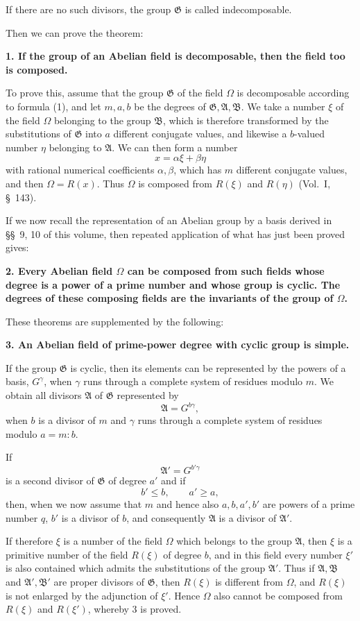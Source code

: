 \documentclass[11pt]{article}
\newcommand{\Om}{\Omega}
\newcommand{\Gg}{\mathfrak G}
\newcommand{\Aa}{\mathfrak A}
\newcommand{\Bb}{\mathfrak B}
\begin{document}
If there are no such divisors, the group $\Gg$ is called indecomposable.

Then we can prove the theorem:

\textbf{1. If the group of an Abelian field is decomposable, then the field too is composed.}

To prove this, assume that the group $\Gg$ of the field $\Om$ is decomposable according to formula (1), and let $m,a,b$ be the degrees of $\Gg,\Aa,\Bb$. We take a number $\xi$ of the field $\Om$ belonging to the group $\Bb$, which is therefore transformed by the substitutions of $\Gg$ into $a$ different conjugate values, and likewise a $b$-valued number $\eta$ belonging to $\Aa$. We can then form a number
\[
  x=\alpha\xi+\beta\eta
\]
with rational numerical coefficients $\alpha,\beta$, which has $m$ different conjugate values, and then $\Om=R(x)$. Thus $\Om$ is composed from $R(\xi)$ and $R(\eta)$ (Vol.~I, \S~143).

If we now recall the representation of an Abelian group by a basis derived in \S\S~9, 10 of this volume, then repeated application of what has just been proved gives:

\textbf{2. Every Abelian field $\Om$ can be composed from such fields whose degree is a power of a prime number and whose group is cyclic. The degrees of these composing fields are the invariants of the group of $\Om$.}

These theorems are supplemented by the following:

\textbf{3. An Abelian field of prime-power degree with cyclic group is simple.}

If the group $\Gg$ is cyclic, then its elements can be represented by the powers of a basis, $G^\gamma$, when $\gamma$ runs through a complete system of residues modulo $m$. We obtain all divisors $\Aa$ of $\Gg$ represented by
\[
  \Aa=G^{b\gamma},
\]
when $b$ is a divisor of $m$ and $\gamma$ runs through a complete system of residues modulo $a=m:b$.

If
\[
  \Aa'=G^{b'\gamma}
\]
is a second divisor of $\Gg$ of degree $a'$ and if
\[
  b'\le b,
  \qquad a'\ge a,
\]
then, when we now assume that $m$ and hence also $a,b,a',b'$ are powers of a prime number $q$, $b'$ is a divisor of $b$, and consequently $\Aa$ is a divisor of $\Aa'$.

If therefore $\xi$ is a number of the field $\Om$ which belongs to the group $\Aa$, then $\xi$ is a primitive number of the field $R(\xi)$ of degree $b$, and in this field every number $\xi'$ is also contained which admits the substitutions of the group $\Aa'$. Thus if $\Aa,\Bb$ and $\Aa',\Bb'$ are proper divisors of $\Gg$, then $R(\xi)$ is different from $\Om$, and $R(\xi)$ is not enlarged by the adjunction of $\xi'$. Hence $\Om$ also cannot be composed from $R(\xi)$ and $R(\xi')$, whereby 3 is proved.
\end{document}
